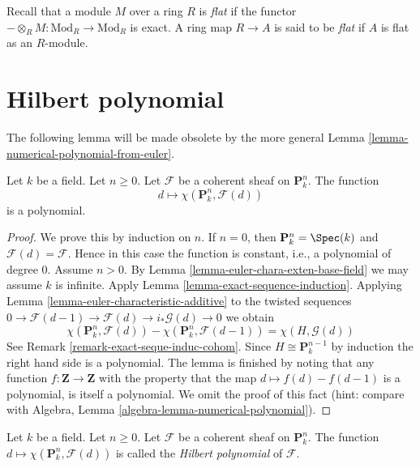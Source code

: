 \documentclass{book}
\begin{document}
\medskip\noindent
Recall that a module $M$ over a ring $R$ is
{\it flat} if the functor
$-\otimes_R M : \text{Mod}_R \to
\text{Mod}_R$ is exact. A ring map
$R \to A$ is said to be {\it flat} if $A$ is
flat as an $R$-module.

\section{Hilbert polynomial}
\label{section-Hilbert-polynomial}

\noindent
The following lemma will be made obsolete by
the more general
Lemma
\ref{lemma-numerical-polynomial-from-euler}.

\begin{lemma}
\label{lemma-hilbert-polynomial}
Let $k$ be a field. Let $n \geq 0$. Let
$\mathcal{F}$ be a coherent sheaf
on $\mathbf{P}^n_k$. The function
$$
d \longmapsto \chi(\mathbf{P}^n_k,
\mathcal{F}(d))
$$
is a polynomial.
\end{lemma}

\begin{proof}
We prove this by induction on $n$. If $n =
0$, then
$\mathbf{P}^n_k = \Spec(k)$ and
$\mathcal{F}(d) = \mathcal{F}$.
Hence in this case the function is constant,
i.e., a polynomial
of degree $0$. Assume $n > 0$. By
Lemma
\ref{lemma-euler-chara-exten-base-field}
we may assume $k$ is infinite. Apply
Lemma \ref{lemma-exact-sequence-induction}.
Applying Lemma
\ref{lemma-euler-characteristic-additive}
to the twisted sequences
$0 \to \mathcal{F}(d - 1) \to \mathcal{F}(d)
\to i_*\mathcal{G}(d) \to 0$
we obtain
$$
\chi(\mathbf{P}^n_k, \mathcal{F}(d)) -
\chi(\mathbf{P}^n_k, \mathcal{F}(d - 1)) =
\chi(H, \mathcal{G}(d))
$$
See Remark
\ref{remark-exact-seque-induc-cohom}.
Since $H \cong \mathbf{P}^{n - 1}_k$
by induction the right hand side is a
polynomial.
The lemma is finished by noting that any
function
$f : \mathbf{Z} \to \mathbf{Z}$ with the
property that the map
$d \mapsto f(d) - f(d - 1)$ is a polynomial,
is itself a polynomial.
We omit the proof of this fact (hint: compare
with
Algebra, Lemma
\ref{algebra-lemma-numerical-polynomial}).
\end{proof}

\begin{definition}
\label{definition-hilbert-polynomial}
Let $k$ be a field. Let $n \geq 0$. Let
$\mathcal{F}$ be a coherent sheaf
on $\mathbf{P}^n_k$. The function
$d \mapsto \chi(\mathbf{P}^n_k,
\mathcal{F}(d))$ is called the
{\it Hilbert polynomial} of $\mathcal{F}$.
\end{definition}
\end{document}
